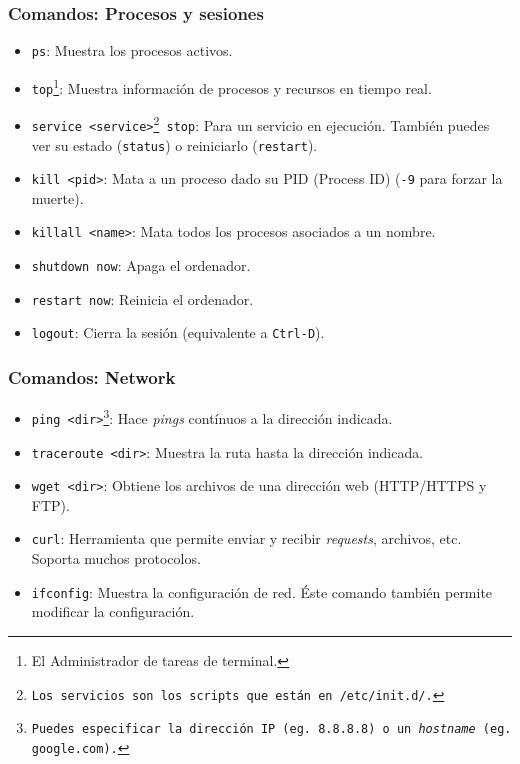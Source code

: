 \documentclass[aspectratio=43]{beamer}
\begin{document}
\begin{frame}
    \frametitle{Comandos: Procesos y sesiones}

    \begin{itemize}
        \item \texttt{ps}: Muestra los procesos activos.
        \item \texttt{top}\footnote{El Administrador de tareas de terminal.}: Muestra información de procesos y recursos en tiempo real.
        \item \texttt{service <service>\footnote{Los servicios son los scripts que están en \texttt{/etc/init.d/}.} stop}: Para un servicio en ejecución. También puedes ver su estado (\texttt{status}) o reiniciarlo (\texttt{restart}).
        \item \texttt{kill <pid>}: Mata a un proceso dado su PID (Process ID) (\texttt{-9} para forzar la muerte).
        \item \texttt{killall <name>}: Mata todos los procesos asociados a un nombre.
    \end{itemize}
    \vspace{8pt}
    \begin{itemize}
        \item \texttt{shutdown now}: Apaga el ordenador.
        \item \texttt{restart now}: Reinicia el ordenador.
        \item \texttt{logout}: Cierra la sesión (equivalente a \texttt{Ctrl-D}).
    \end{itemize}

\end{frame}


\begin{frame}
    \frametitle{Comandos: Network}

    \begin{itemize}
        \item \texttt{ping <dir>\footnote{Puedes especificar la dirección IP (eg. \texttt{8.8.8.8}) o un \textit{hostname} (eg. \texttt{google.com}).}}: Hace \textit{pings} contínuos a la dirección indicada.
        \item \texttt{traceroute <dir>}: Muestra la ruta hasta la dirección indicada.
        \item \texttt{wget <dir>}: Obtiene los archivos de una dirección web (HTTP/HTTPS y FTP).
        \item \texttt{curl}: Herramienta que permite enviar y recibir \textit{requests}, archivos, etc. Soporta muchos protocolos.
        \item \texttt{ifconfig}: Muestra la configuración de red. Éste comando también permite modificar la configuración.
    \end{itemize}

\end{frame}
\end{document}
